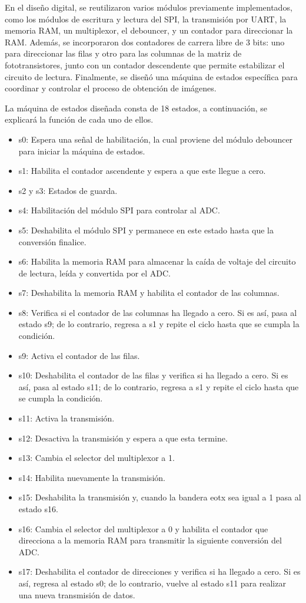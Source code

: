 En el diseño digital, se reutilizaron varios módulos previamente implementados, como los módulos de escritura y lectura del SPI, la transmisión por UART, la memoria RAM, un multiplexor, el debouncer, y un contador para direccionar la RAM. Además, se incorporaron dos contadores de carrera libre de 3 bits: uno para direccionar las filas y otro para las columnas de la matriz de fototransistores, junto con un contador descendente que permite estabilizar el circuito de lectura. Finalmente, se diseñó una máquina de estados específica para coordinar y controlar el proceso de obtención de imágenes.


La máquina de estados diseñada consta de 18 estados, a continuación, se explicará la función de cada uno de ellos.

\begin{itemize}
\item s0: Espera una señal de habilitación, la cual proviene del módulo debouncer para iniciar la máquina de estados.
\item s1: Habilita el contador ascendente y espera a que este llegue a cero.
\item s2 y s3: Estados de guarda.
\item s4: Habilitación del módulo SPI para controlar al ADC.
\item s5: Deshabilita el módulo SPI y permanece en este estado hasta que la conversión finalice.
\item s6: Habilita la memoria RAM para almacenar la caída de voltaje del circuito de lectura, leída y convertida por el ADC.
\item s7: Deshabilita la memoria RAM y habilita el contador de las columnas.
\item s8: Verifica si el contador de las columnas ha llegado a cero. Si es así, pasa al estado s9; de lo contrario, regresa a s1 y repite el ciclo hasta que se cumpla la condición.
\item s9: Activa el contador de las filas.
\item s10: Deshabilita el contador de las filas y verifica si ha llegado a cero. Si es así, pasa al estado s11; de lo contrario, regresa a s1 y repite el ciclo hasta que se cumpla la condición. 
\item s11: Activa la transmisión.
\item s12: Desactiva la transmisión y espera a que esta termine.
\item s13: Cambia el selector del multiplexor a 1.
\item s14: Habilita nuevamente la transmisión.
\item s15: Deshabilita la transmisión y, cuando la bandera eotx sea igual a 1 pasa al estado s16.
\item s16: Cambia el selector del multiplexor a 0 y habilita el contador que direcciona a la memoria RAM para transmitir la siguiente conversión del ADC.
\item s17: Deshabilita el contador de direcciones y verifica si ha llegado a cero. Si es así, regresa al estado s0; de lo contrario, vuelve al estado s11 para realizar una nueva transmisión de datos.
\end{itemize}
